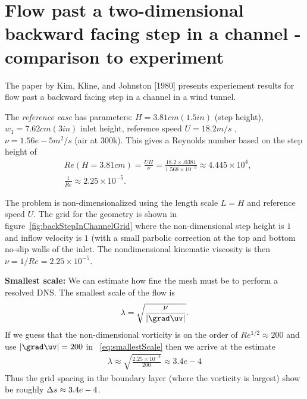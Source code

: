 \documentclass[11pt]{article}
\begin{document}
\section{Flow past a two-dimensional backward facing step in a channel - comparison to experiment }

The paper by Kim, Kline, and Johnston [1980] presents experiement results for flow past a
backward facing step in a channel in a wind tunnel. 

The {\em reference case} has parameters: $H=3.81 cm (1.5 in)$ (step height), $w_1 = 7.62cm (3 in)$ inlet height,
reference speed $U=18.2 m/s$ , $\nu=1.56 e-5 m^2/s$ (air at 300k). This gives
a Reynolds number based on the step height of
\begin{align*}
 &  Re(H=3.81 cm) = \frac{U H}{\nu} = \frac{18.2 \times .0381}{1.568 \times 10^{-5}} \approx  4.445 \times 10^4, \\
 &  \frac{1}{Re} \approx 2.25 \times 10^{-5}. 
\end{align*}

The problem is non-dimensionalized using the length scale $L=H$ and reference speed $U$. 
The grid for the geometry is shown in figure~\ref{fig:backStepInChannelGrid} where the non-dimensional
step height is $1$ and inflow velocity is $1$ (with a small parbolic correction at the top and bottom
no-slip walls of the inlet. The nondimensional kinematic viscosity is then $\nu= 1/Re = 2.25 \times 10^{-5}$. 

{\bf Smallest scale:} We can estimate how fine the mesh must be to perform a resolved DNS.
The smallest scale of the flow is~\cite{HKR1}
\begin{align}
    \lambda = \sqrt{\frac{\nu}{|\grad\uv|}}.  \label{eq:smallestScale}
\end{align}
If we guess that the non-dimensional vorticity is on the order of $Re^{1/2} \approx 200$ and use $|\grad\uv|=200$ in ~\eqref{eq:smallestScale}
then we arrive at the estimate 
\begin{align*}
    \lambda \approx  \sqrt{\frac{2.25 \times 10^{-5}}{200}} \approx 3.4e-4
\end{align*}
Thus the grid spacing in the boundary layer (where the vorticity is largest) show be roughly $\Delta s\approx 3.4e-4$.
\end{document}
